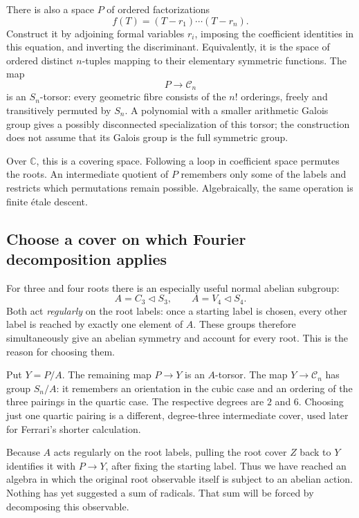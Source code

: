 \documentclass[11pt]{article}
\theoremstyle{remark}
\newcommand{\C}{\mathbb C}
\begin{document}
There is also a space \(P\) of ordered factorizations
\[
f(T)=(T-r_1)\cdots(T-r_n).
\]
Construct it by adjoining formal variables \(r_i\), imposing the coefficient identities in this equation, and inverting the discriminant. Equivalently, it is the space of ordered distinct \(n\)-tuples mapping to their elementary symmetric functions. The map
\[
P\longrightarrow \mathcal C_n
\]
is an \(S_n\)-torsor: every geometric fibre consists of the \(n!\) orderings, freely and transitively permuted by \(S_n\). A polynomial with a smaller arithmetic Galois group gives a possibly disconnected specialization of this torsor; the construction does not assume that its Galois group is the full symmetric group.

Over \(\C\), this is a covering space. Following a loop in coefficient space permutes the roots. An intermediate quotient of \(P\) remembers only some of the labels and restricts which permutations remain possible. Algebraically, the same operation is finite \'etale descent.

\subsection{Choose a cover on which Fourier decomposition applies}

For three and four roots there is an especially useful normal abelian subgroup:
\[
A=C_3\triangleleft S_3,
\qquad
A=V_4\triangleleft S_4.
\]
Both act \emph{regularly} on the root labels: once a starting label is chosen, every other label is reached by exactly one element of \(A\). These groups therefore simultaneously give an abelian symmetry and account for every root. This is the reason for choosing them.

Put \(Y=P/A\). The remaining map \(P\to Y\) is an \(A\)-torsor. The map \(Y\to \mathcal C_n\) has group \(S_n/A\): it remembers an orientation in the cubic case and an ordering of the three pairings in the quartic case. The respective degrees are \(2\) and \(6\). Choosing just one quartic pairing is a different, degree-three intermediate cover, used later for Ferrari's shorter calculation.

Because \(A\) acts regularly on the root labels, pulling the root cover \(Z\) back to \(Y\) identifies it with \(P\to Y\), after fixing the starting label. Thus we have reached an algebra in which the original root observable itself is subject to an abelian action. Nothing has yet suggested a sum of radicals. That sum will be forced by decomposing this observable.
\end{document}
